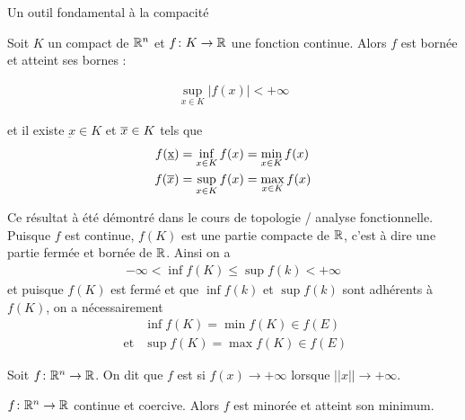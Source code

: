 \documentclass[french,a4paper,10pt]{article}
\begin{document}
	Un outil fondamental à la compacité
	
	\begin{theorem}
		Soit $K$ un compact de $\mathbb{R}^n$ et $f\colon K\to \mathbb{R}$ une fonction continue. Alors $f$ est bornée et atteint ses bornes :
		
			\[\begin{aligned}
				\sup_{x\in K}|f(x)|<+\infty
			\end{aligned}\]
		
		et il existe $\underbar x\in K$ et $\overline{x}\in K$ tels que 
			\[\begin{aligned}
				f(\underbar x)&= \inf_{x\in K}f(x)=\min_{x\in K}f(x)\\
				f(\overline{x})&= \sup_{x\in K}f(x)=\max_{x\in K}f(x)\\
			\end{aligned}\]
	\end{theorem}

	\begin{myproof}
		Ce résultat à été démontré dans le cours de topologie / analyse fonctionnelle. Puisque $f$ est continue, $f(K)$ est une partie compacte de $\mathbb{R}$, c'est à dire une partie fermée et bornée de $\mathbb{R}$. Ainsi on a
		\[\begin{aligned}
			-\infty<\inf f(K)\le \sup f(k)<+\infty
		\end{aligned}\]
		et puisque $f(K)$ est fermé et que $\inf f(k)$ et $\sup f(k)$ sont adhérents à $f(K)$, on a nécessairement
			\[\begin{aligned}
				&\inf f(K)=\min f(K)\in f(E)\\
				\text{ et}&\sup f(K)=\max f(K)\in f(E)
			\end{aligned}\]
	\end{myproof}
	\begin{definition}
		Soit $f\colon\mathbb{R}^n\to \mathbb{R}$. On dit que $f$ est  si $f(x)\to+\infty$ lorsque $||x||\to+\infty$.
		
	\end{definition}
	\begin{theorem}
		$f\colon\mathbb{R}^n\to\mathbb{R}$ continue et coercive. Alors $f$ est minorée et atteint son minimum.
		
	\end{theorem}
\end{document}
